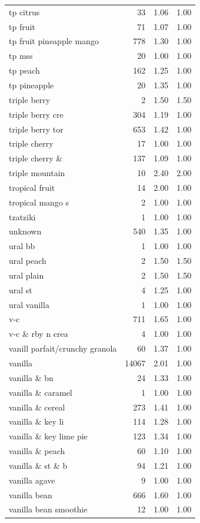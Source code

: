 \begin{table}
\begin{tabular}{lrrr}
tp citrus & 33 & 1.06 & 1.00 \\
tp fruit & 71 & 1.07 & 1.00 \\
tp fruit pineapple mango & 778 & 1.30 & 1.00 \\
tp mss & 20 & 1.00 & 1.00 \\
tp peach & 162 & 1.25 & 1.00 \\
tp pineapple & 20 & 1.35 & 1.00 \\
triple berry & 2 & 1.50 & 1.50 \\
triple berry cre & 304 & 1.19 & 1.00 \\
triple berry tor & 653 & 1.42 & 1.00 \\
triple cherry & 17 & 1.00 & 1.00 \\
triple cherry \& & 137 & 1.09 & 1.00 \\
triple mountain & 10 & 2.40 & 2.00 \\
tropical fruit & 14 & 2.00 & 1.00 \\
tropical mango s & 2 & 1.00 & 1.00 \\
tzatziki & 1 & 1.00 & 1.00 \\
unknown & 540 & 1.35 & 1.00 \\
ural bb & 1 & 1.00 & 1.00 \\
ural peach & 2 & 1.50 & 1.50 \\
ural plain & 2 & 1.50 & 1.50 \\
ural st & 4 & 1.25 & 1.00 \\
ural vanilla & 1 & 1.00 & 1.00 \\
v-c & 711 & 1.65 & 1.00 \\
v-c \& rby n crea & 4 & 1.00 & 1.00 \\
vanill parfait/crunchy granola & 60 & 1.37 & 1.00 \\
vanilla & 14067 & 2.01 & 1.00 \\
vanilla \& bn & 24 & 1.33 & 1.00 \\
vanilla \& caramel & 1 & 1.00 & 1.00 \\
vanilla \& cereal & 273 & 1.41 & 1.00 \\
vanilla \& key li & 114 & 1.28 & 1.00 \\
vanilla \& key lime pie & 123 & 1.34 & 1.00 \\
vanilla \& peach & 60 & 1.10 & 1.00 \\
vanilla \& st \& b & 94 & 1.21 & 1.00 \\
vanilla agave & 9 & 1.00 & 1.00 \\
vanilla bean & 666 & 1.60 & 1.00 \\
vanilla bean smoothie & 12 & 1.00 & 1.00 \\

\end{tabular}
\end{table}
